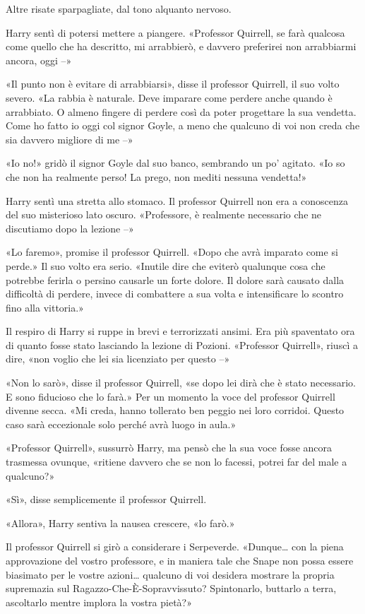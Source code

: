 Altre risate sparpagliate, dal tono alquanto nervoso.

Harry sentì di potersi mettere a piangere. «Professor Quirrell, se farà qualcosa come quello che ha descritto, mi arrabbierò, e davvero preferirei non arrabbiarmi ancora, oggi –»

«Il punto non è evitare di arrabbiarsi», disse il professor Quirrell, il suo volto severo. «La rabbia è naturale. Deve imparare come perdere anche quando è arrabbiato. O almeno fingere di perdere così da poter progettare la sua vendetta. Come ho fatto io oggi col signor Goyle, a meno che qualcuno di voi non creda che sia davvero migliore di me –»

«Io no!» gridò il signor Goyle dal suo banco, sembrando un po’ agitato. «Io so che non ha realmente perso! La prego, non mediti nessuna vendetta!»

Harry sentì una stretta allo stomaco. Il professor Quirrell non era a conoscenza del suo misterioso lato oscuro. «Professore, è realmente necessario che ne discutiamo dopo la lezione –»

«Lo faremo», promise il professor Quirrell. «Dopo che avrà imparato come si perde.» Il suo volto era serio. «Inutile dire che eviterò qualunque cosa che potrebbe ferirla o persino causarle un forte dolore. Il dolore sarà causato dalla difficoltà di perdere, invece di combattere a sua volta e intensificare lo scontro fino alla vittoria.»

Il respiro di Harry si ruppe in brevi e terrorizzati ansimi. Era più spaventato ora di quanto fosse stato lasciando la lezione di Pozioni. «Professor Quirrell», riuscì a dire, «non voglio che lei sia licenziato per questo –»

«Non lo sarò», disse il professor Quirrell, «se dopo lei dirà che è stato necessario. E sono fiducioso che lo farà.» Per un momento la voce del professor Quirrell divenne secca. «Mi creda, hanno tollerato ben peggio nei loro corridoi. Questo caso sarà eccezionale solo perché avrà luogo in aula.»

«Professor Quirrell», sussurrò Harry, ma pensò che la sua voce fosse ancora trasmessa ovunque, «ritiene davvero che se non lo facessi, potrei far del male a qualcuno?»

«Sì», disse semplicemente il professor Quirrell.

«Allora», Harry sentiva la nausea crescere, «lo farò.»

Il professor Quirrell si girò a considerare i Serpeverde. «Dunque… con la piena approvazione del vostro professore, e in maniera tale che Snape non possa essere biasimato per le vostre azioni… qualcuno di voi desidera mostrare la propria supremazia sul Ragazzo-Che-È-Sopravvissuto? Spintonarlo, buttarlo a terra, ascoltarlo mentre implora la vostra pietà?»

